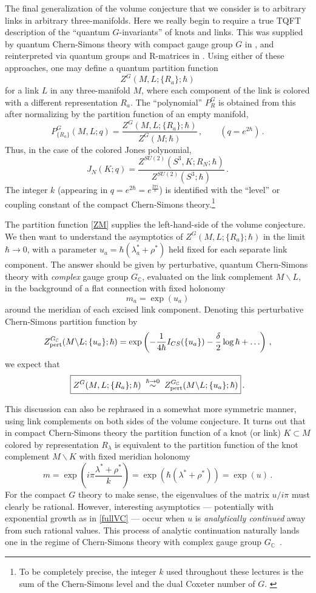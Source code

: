 \documentclass[letterpaper,12pt]{article}
\numberwithin{equation}{section}
\newcommand{\be}{\begin{equation}}
\newcommand{\ee}{\end{equation}}
\newcommand{\bs}{\backslash}
\newcommand{\C}{{\mathbb{C}}}
\renewcommand{\=}{\;=\;}
\begin{document}
The final generalization of the volume conjecture that we consider is to arbitrary links in arbitrary three-manifolds. Here we really begin to require a true TQFT description of the ``quantum $G$-invariants'' of knots and links. This was supplied by quantum Chern-Simons theory with compact gauge group $G$ in \cite{Wit-Jones}, and reinterpreted via quantum groups and R-matrices in \cite{Resh-Tur}. Using either of these approaches, one may define a quantum partition function
%
\be  Z^G(M,L;\{R_a\};\hbar) \label{ZM} \ee
%
for a link $L$ in any three-manifold $M$, where each component of the link is colored with a different representation $R_a$. The ``polynomial'' $P^G_R$ is obtained from this after normalizing by the partition function of an empty manifold,
%
\be P^G_{\{R_a\}}(M,L;q) = \frac{Z^G(M,L;\{R_a\};\hbar)}{Z^G(M;\hbar)}\,,\qquad (q=e^{2\hbar})\,. \ee
%
Thus, in the case of the colored Jones polynomial,
%
\be J_N(K;q) = \frac{Z^{SU(2)}(S^3,K;R_N;\hbar)}{Z^{SU(2)}(S^3;\hbar)}\,. \ee
%
The integer $k$ (appearing in $q=e^{2\hbar}=e^{\frac{2\pi i}{k}}$) is identified with the ``level'' or coupling constant of the compact Chern-Simons theory.\footnote{To be completely precise, the integer $k$ used throughout these lectures is the sum of the Chern-Simons level and the dual Coxeter number of $G$. \label{foot:k}}


The partition function \eqref{ZM} supplies the left-hand-side of the volume conjecture.
We then want to understand the asymptotics of $Z^G(M,L;\{R_a\};\hbar)$ in the limit $\hbar\to 0$,
with a parameter $u_a = \hbar(\lambda_a^* + \rho^*)$ held fixed for each separate link component.
The answer should be given by perturbative, quantum Chern-Simons theory with \emph{complex} gauge group $G_\C$,
evaluated on the link complement $M\bs L$, in the background of a flat connection with fixed holonomy
%
\be m_a = \exp(u_a) \ee
%
around the meridian of each excised link component. Denoting this perturbative Chern-Simons partition function by
%
\be Z^{G_\C}_{\rm pert}(M\bs L;\{u_a\};\hbar) = \exp\left(-\frac1{4\hbar}I_{CS}(\{u_a\})-\frac\delta2\log\hbar+\ldots\right)\,, \ee
%
we expect that
%
\be \boxed{Z^G(M,L;\{R_a\};\hbar) \;\overset{\hbar\to 0}{\sim}\; Z^{G_\C}_{\rm pert}(M\bs L;\{u_a\};\hbar)}\,. \label{fullVC} \ee
%

This discussion can also be rephrased in a somewhat more symmetric manner, using link complements on both sides of the volume conjecture. It turns out that in compact Chern-Simons theory the partition function of a knot (or link) $K\subset M$ colored by representation $R_\lambda$ is equivalent to the partition function of the knot complement $M\bs K$ with fixed meridian holonomy
%
\be m = \exp\left(i\pi\frac{\lambda^*+\rho^*}{k}\right) = \exp\left(\hbar(\lambda^*+\rho^*)\right) = \exp(u)\,. \ee
%
For the compact $G$ theory to make sense, the eigenvalues of the matrix $u/i\pi$ must clearly be rational. However, interesting asymptotics --- potentially with exponential growth as in \eqref{fullVC} --- occur when $u$ is \emph{analytically continued} away from such rational values. This process of analytic continuation naturally lands one in the regime of Chern-Simons theory with complex gauge group $G_\C$~\cite{DGLZ}. \\
\end{document}
